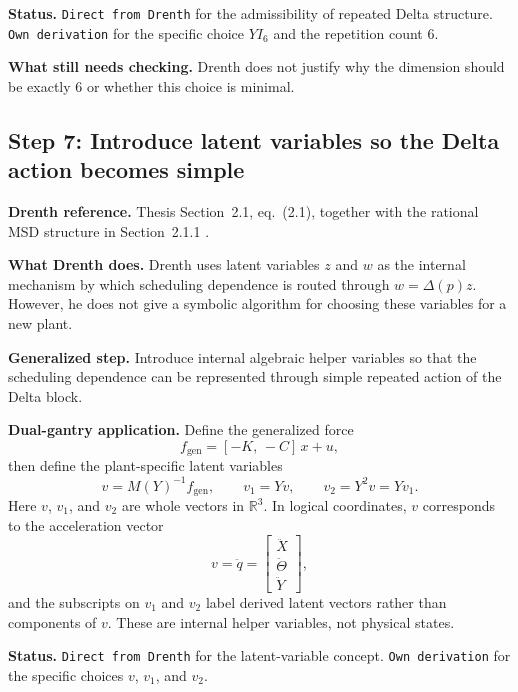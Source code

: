 ﻿\documentclass[11pt]{article}
\newcommand{\R}{\mathbb{R}}
\newcommand{\audititem}[2]{\par\smallskip\noindent\textbf{#1.} #2\par}
\newcommand{\statusline}[1]{\texttt{#1}}
\begin{document}
\audititem{Status}{\statusline{Direct from Drenth} for the admissibility of
repeated Delta structure. \statusline{Own derivation} for the specific choice
$YI_6$ and the repetition count $6$.}

\audititem{What still needs checking}{Drenth does not justify why the dimension
should be exactly $6$ or whether this choice is minimal.}

\subsection{Step 7: Introduce latent variables so the Delta action becomes simple}

\audititem{Drenth reference}{Thesis Section~2.1, eq.~(2.1), together with the
rational MSD structure in Section~2.1.1 \cite{drenth2025thesis}.}

\audititem{What Drenth does}{Drenth uses latent variables $z$ and $w$ as the
internal mechanism by which scheduling dependence is routed through
$w = \Delta(p)z$. However, he does not give a symbolic algorithm for choosing
these variables for a new plant.}

\audititem{Generalized step}{Introduce internal algebraic helper variables so
that the scheduling dependence can be represented through simple repeated action
of the Delta block.}

\audititem{Dual-gantry application}{Define the generalized force
\begin{equation}
    f_{\mathrm{gen}} = [-K,\,-C]\,x + u,
    \label{eqv:fgen}
\end{equation}
then define the plant-specific latent variables
\begin{equation}
    v = M(Y)^{-1} f_{\mathrm{gen}}, \qquad
    v_1 = Yv, \qquad
    v_2 = Y^2 v = Y v_1.
    \label{eqv:latent}
\end{equation}
Here $v$, $v_1$, and $v_2$ are whole vectors in $\R^3$. In logical coordinates,
$v$ corresponds to the acceleration vector
\[
v = \ddot q = \begin{bmatrix} \ddot X \\ \ddot \Theta \\ \ddot Y \end{bmatrix},
\]
and the subscripts on $v_1$ and $v_2$ label derived latent vectors rather than
components of $v$. These are internal helper variables, not physical states.}

\audititem{Status}{\statusline{Direct from Drenth} for the latent-variable
concept. \statusline{Own derivation} for the specific choices
$v$, $v_1$, and $v_2$.}
\end{document}
